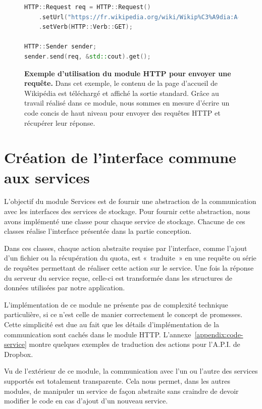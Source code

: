 \begin{figure}[h!]
    \begin{lstlisting}[language=C++]
HTTP::Request req = HTTP::Request()
    .setUrl("https://fr.wikipedia.org/wiki/Wikip%C3%A9dia:Accueil_principal")
    .setVerb(HTTP::Verb::GET);

HTTP::Sender sender;
sender.send(req, &std::cout).get();
    \end{lstlisting}
    \caption{\textbf{Exemple d'utilisation du module HTTP pour envoyer une requête.} Dans cet exemple, le contenu de la page d'accueil de Wikipédia est téléchargé et affiché la sortie standard. Grâce au travail réalisé dans ce module, nous sommes en mesure d'écrire un code concis de haut niveau pour envoyer des requêtes HTTP et récupérer leur réponse.}
    \label{fig:implementation-http-exemple}
\end{figure}

\section{Création de l'interface commune aux services}

L'objectif du module Services est de fournir une abstraction de la communication avec les interfaces des services de stockage. Pour fournir cette abstraction, nous avons implémenté une classe pour chaque service de stockage. Chacune de ces classes réalise l'interface présentée dans la partie conception.

Dans ces classes, chaque action abstraite requise par l'interface, comme l'ajout d'un fichier ou la récupération du quota, est «~traduite~» en une requête ou série de requêtes permettant de réaliser cette action sur le service. Une fois la réponse du serveur du service reçue, celle-ci est transformée dans les structures de données utilisées par notre application.

L'implémentation de ce module ne présente pas de complexité technique particulière, si ce n'est celle de manier correctement le concept de promesses. Cette simplicité est due au fait que les détails d'implémentation de la communication sont cachés dans le module HTTP. L'annexe~\ref{appendix:code-service} montre quelques exemples de traduction des actions pour l'A.P.I. de Dropbox.

Vu de l'extérieur de ce module, la communication avec l'un ou l'autre des services supportés est totalement transparente. Cela nous permet, dans les autres modules, de manipuler un service de façon abstraite sans craindre de devoir modifier le code en cas d'ajout d'un nouveau service.

